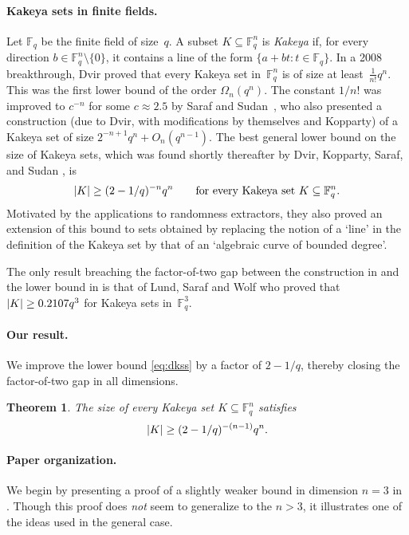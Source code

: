 \documentclass{daj}
\newtheorem{theorem}{Theorem}
\theoremstyle{definition}
\newcommand*{\Fq}{\mathbb{F}_q}                                  %
\DeclarePairedDelimiter\abs{\lvert}{\rvert}                     %
\begin{document}
\paragraph{Kakeya sets in finite fields.}
Let $\Fq$ be the finite field of size~$q$. A subset $K\subseteq \Fq^n$ is \emph{Kakeya} if, for every direction $b\in \Fq^n\setminus\{0\}$, 
  it contains a line of the form $\{a+bt : t\in \Fq\}$. In a 2008 breakthrough, Dvir \cite{dvir} proved that every Kakeya set in~$\Fq^n$
  is of size at least~$\frac{1}{n!}q^n$. This was the first lower bound of the order $\Omega_n(q^n)$.
  The constant $1/n!$ was improved to $c^{-n}$ for some $c\approx 2.5$ by Saraf and Sudan~\cite{saraf_sudan},
  who also presented a construction (due to Dvir, with modifications by themselves and Kopparty)
  of a Kakeya set of size $2^{-n+1}q^{n}+O_n(q^{n-1})$.
  The best general lower bound on the size of Kakeya sets, which was found shortly thereafter by Dvir, Kopparty, Saraf, and Sudan \cite{dkss},
  is
  \begin{equation}\label{eq:dkss}
    \abs{K}\geq (2-1/q)^{-n} q^n\qquad\text{for every Kakeya set }K\subseteq\Fq^n.
  \end{equation}
  Motivated by the applications to randomness extractors, they also proved an extension of this
  bound to sets obtained by replacing the notion of a `line' in the definition of the Kakeya
  set by that of an `algebraic curve of bounded degree'.

  The only result breaching the factor-of-two gap between the construction in \cite{saraf_sudan} and the lower bound in \cite{dkss}
  is that of Lund, Saraf and Wolf \cite{lund_saraf_wolf} who proved that $\abs{K}\geq 0.2107q^3$ for Kakeya sets in~$\Fq^3$.

\paragraph{Our result.}
  We improve the lower bound \eqref{eq:dkss} by a factor of $2-1/q$, thereby
  closing the factor-of-two gap in all dimensions.   
  \begin{theorem}\label{thm:high}
  The size of every Kakeya set $K\subseteq\Fq^n$ satisfies
  \[
    \abs{K}\geq (2-1/q)^{-(n-1)}q^n.
  \]
  \end{theorem}

\paragraph{Paper organization.}
We begin by presenting a proof of a slightly weaker
bound in dimension $n=3$ in .
Though this proof does \emph{not} seem to generalize to the $n>3$,
it illustrates one of the ideas used in the general case.
\end{document}
